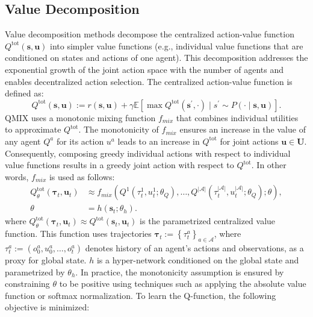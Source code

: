\documentclass[10pt]{article} %
\begin{document}
\subsection{Value Decomposition}
Value decomposition methods \citep{sunehag2017value} decompose the centralized action-value function $Q^{\text{tot}}(\mathbf{s},\mathbf{u})$ into simpler value functions (e.g., individual value functions that are conditioned on states and actions of one agent). This decomposition addresses the exponential growth of the joint action space with the number of agents and enables decentralized action selection. The centralized action-value function is defined as:
\begin{equation*}
    Q^{\text{tot}}(\mathbf{s},\mathbf{u}) := r(\mathbf{s}, \mathbf{u})+\gamma \mathbb{E}\left[\max Q^{\mathrm{\text{tot}}}\left(\mathbf{s}^{\prime}, \cdot\right) \mid s^{\prime} \sim P(\cdot \mid \mathbf{s}, \mathbf{u})\right].
\end{equation*}
QMIX \citep{rashid2018qmix} uses a monotonic mixing function $f_{\textit{mix}}$ that combines individual utilities to approximate $Q^{\text{tot}}$. The monotonicity of $f_{\textit{mix}}$ ensures an increase in the value of any agent $Q^a$ for its action $u^a$ leads to an increase in $Q^{\text{tot}}$ for joint actions $\mathbf{u} \in \mathbf{U}$. Consequently, composing greedy individual actions with respect to individual value functions results in a greedy joint action with respect to $Q^{\text{tot}}$. In other words, $f_{\textit{mix}}$ is used as follows:
\begin{align*}
 Q_\theta^{\mathrm{tot}}\left(\boldsymbol{\tau}_t, \mathbf{u}_t\right) &\approx f_{\textit{mix}}\left(Q^1\left(\tau_t^1, u_t^1 ; \theta_Q\right), \ldots, Q^{|\mathcal{A}|}\left(\tau_t^{|\mathcal{A}|}, u_t^{|\mathcal{A}|} ; \theta_Q\right) ; \theta\right), \\
\theta &= h(\boldsymbol{s}_t; \theta_h).
\end{align*}
where $Q_\theta^{\mathrm{tot}}\left(\boldsymbol{\tau}_t, \mathbf{u}_t\right) \approx Q^{\mathrm{tot}}\left(\mathbf{s}_t, \mathbf{u}_t\right)$ is the parametrized centralized value function. This function uses trajectories $\boldsymbol{\tau}_t:=\left\{\tau_t^a\right\}_{a \in \mathcal{A}}$, where $\tau_t^a := \left(o_0^a, u_0^a, \ldots, o_t^a\right)$ denotes history of an agent's actions and observations, as a proxy for global state.
$h$ is a hyper-network \citep{ha2022hypernetworks} conditioned on the global state and parametrized by $\theta_h$. In practice, the monotonicity assumption is ensured by constraining $\theta$ to be positive using techniques such as applying the absolute value function or softmax normalization. To learn the Q-function, the following objective is minimized:
\end{document}
